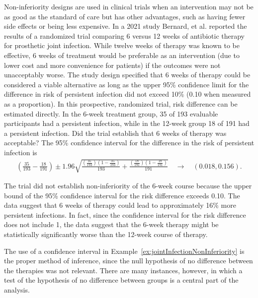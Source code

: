 \begin{examplewrap}
  \begin{nexample}{Non-inferiority designs are used in clinical trials when an intervention may not be as good as the standard of care but has other advantages, such as having fewer side effects or being less expensive. In a 2021 study Bernard, et al.  reported the results of a randomized trial comparing 6 versus 12 weeks of antibiotic therapy for prosthetic joint infection. While twelve weeks of therapy was known to be effective, 6 weeks of treatment would be preferable as an intervention (due to lower cost and more convenience for patients) if the outcomes were not unacceptably worse. The study design specified that 6 weeks of therapy could be considered a viable alternative as long as the upper 95\% confidence limit for the difference in risk of persistent infection did not exceed 10\% (0.10 when measured as a proportion). In this prospective, randomized trial, risk difference can be estimated directly. In the 6-week treatment group, 35 of 193 evaluable participants had a persistent infection, while in the 12-week group 18 of 191 had a persistent infection.  Did the trial establish that 6 weeks of therapy was acceptable?}\label{ex:jointInfectionNonInferiority}
The 95\% confidence interval for the difference in the risk of persistent infection is
\begin{align*}
   \left( \frac{35}{193} - \frac{18}{191} \right) \pm 1.96  \sqrt{\frac{(\frac{35}{193} )(1 - \frac{35}{193} )}{193}
   + \frac{(\frac{18}{191})(1 - \frac{18}{191})}{191}} \quad \to \quad (0.018, 0.156).
\end{align*}

The trial did not establish non-inferiority of the 6-week course because the upper bound of the 95\% confidence interval for the risk difference exceeds 0.10.  The data suggest that 6 weeks of therapy could lead to approximately 16\% more persistent infections. In fact, since the confidence interval for the risk difference does not include 1, the data suggest that the 6-week therapy might be statistically significantly worse than the 12-week course of therapy.

\end{nexample}
\end{examplewrap}

The use of a confidence interval in Example~\ref{ex:jointInfectionNonInferiority} is the proper method of inference, since the null hypothesis of no difference between the therapies was not relevant.  There are many instances, however, in which a test of the hypothesis of no difference between groups is a central part of the analysis.

